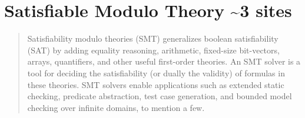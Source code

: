 % 
% 





\section{Satisfiable Modulo Theory \textasciitilde 3 sites}
\begin{quote}
	Satisfiability modulo theories (SMT) generalizes boolean satisfiability (SAT) by
	adding equality reasoning, arithmetic, fixed-size bit-vectors, arrays, quantifiers,
	and other useful first-order theories. An SMT solver is a tool for deciding the satisfiability (or dually the validity) of formulas in these theories. SMT solvers enable
	applications such as extended static checking, predicate abstraction, test case generation, and bounded model checking over infinite domains, to mention a few. \cite{demouraZ3EfficientSMT2008}
\end{quote}


